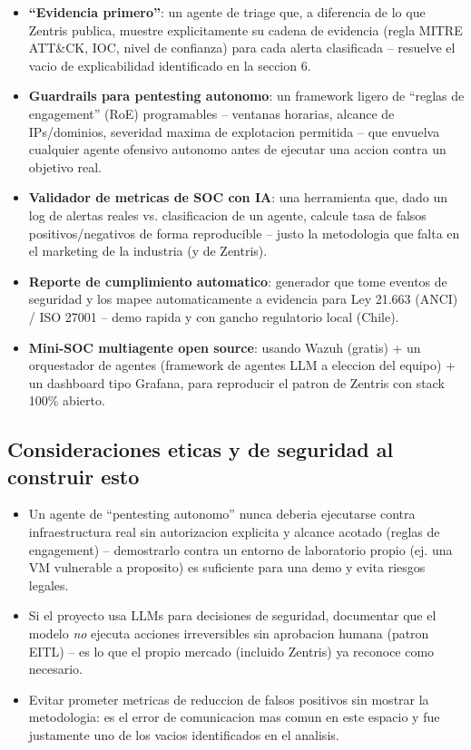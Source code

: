 \documentclass[11pt,a4paper]{article}
\begin{document}
\begin{itemize}[leftmargin=1.4em]
  \item \textbf{``Evidencia primero''}: un agente de triage que, a diferencia de lo que Zentris
  publica, muestre explicitamente su cadena de evidencia (regla MITRE ATT\&CK, IOC, nivel de
  confianza) para cada alerta clasificada -- resuelve el vacio de explicabilidad identificado
  en la seccion 6.
  \item \textbf{Guardrails para pentesting autonomo}: un framework ligero de ``reglas de
  engagement'' (RoE) programables -- ventanas horarias, alcance de IPs/dominios, severidad
  maxima de explotacion permitida -- que envuelva cualquier agente ofensivo autonomo antes de
  ejecutar una accion contra un objetivo real.
  \item \textbf{Validador de metricas de SOC con IA}: una herramienta que, dado un log de
  alertas reales vs. clasificacion de un agente, calcule tasa de falsos positivos/negativos de
  forma reproducible -- justo la metodologia que falta en el marketing de la industria (y de
  Zentris).
  \item \textbf{Reporte de cumplimiento automatico}: generador que tome eventos de seguridad y
  los mapee automaticamente a evidencia para Ley 21.663 (ANCI) / ISO 27001 -- demo rapida y con
  gancho regulatorio local (Chile).
  \item \textbf{Mini-SOC multiagente open source}: usando Wazuh (gratis) + un orquestador de
  agentes (framework de agentes LLM a eleccion del equipo) + un dashboard tipo Grafana, para
  reproducir el patron de Zentris con stack 100\% abierto.
\end{itemize}

\subsection{Consideraciones eticas y de seguridad al construir esto}

\begin{itemize}[leftmargin=1.4em]
  \item Un agente de ``pentesting autonomo'' nunca deberia ejecutarse contra infraestructura
  real sin autorizacion explicita y alcance acotado (reglas de engagement) -- demostrarlo contra
  un entorno de laboratorio propio (ej. una VM vulnerable a proposito) es suficiente para una
  demo y evita riesgos legales.
  \item Si el proyecto usa LLMs para decisiones de seguridad, documentar que el modelo
  \emph{no} ejecuta acciones irreversibles sin aprobacion humana (patron EITL) -- es lo que el
  propio mercado (incluido Zentris) ya reconoce como necesario.
  \item Evitar prometer metricas de reduccion de falsos positivos sin mostrar la metodologia:
  es el error de comunicacion mas comun en este espacio y fue justamente uno de los vacios
  identificados en el analisis.
\end{itemize}
\end{document}
